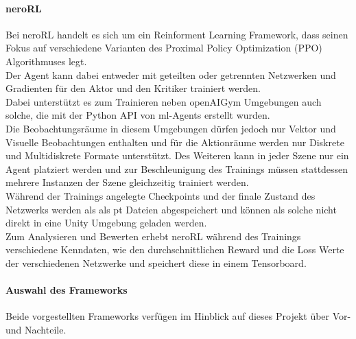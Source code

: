 \paragraph{neroRL}\fup \label{neroRLFramework}
\noindent Bei neroRL \cite{neroRL} handelt es sich um ein Reinforment Learning Framework, dass seinen Fokus auf verschiedene Varianten des Proximal Policy Optimization (PPO) Algorithmuses legt.\\
Der Agent kann dabei entweder mit geteilten oder getrennten Netzwerken und Gradienten für den Aktor und den Kritiker trainiert werden. \\
Dabei unterstützt es zum Trainieren neben openAIGym Umgebungen auch solche, die mit der Python API von ml-Agents erstellt wurden.\\
Die Beobachtungsräume in diesem Umgebungen dürfen jedoch nur Vektor und Visuelle Beobachtungen enthalten und für die Aktionräume werden nur Diskrete und Multidiskrete Formate unterstützt.
Des Weiteren kann in jeder Szene nur ein Agent platziert werden und zur Beschleunigung des Trainings müssen stattdessen mehrere Instanzen der Szene gleichzeitig trainiert werden.\\

\noindent Während der Trainings angelegte Checkpoints und der finale Zustand des Netzwerks werden als als pt Dateien abgespeichert und können als solche nicht direkt in eine Unity Umgebung geladen werden.\\
Zum Analysieren und Bewerten erhebt neroRL während des Trainings verschiedene Kenndaten, wie den durchschnittlichen Reward und die Loss Werte der verschiedenen Netzwerke und speichert diese in einem Tensorboard.

\paragraph{Auswahl des Frameworks} \fup

Beide vorgestellten Frameworks verfügen im Hinblick auf dieses Projekt über Vor- und Nachteile.

